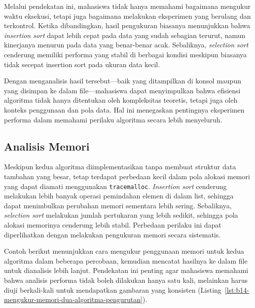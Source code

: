 Melalui pendekatan ini, mahasiswa tidak hanya memahami bagaimana mengukur waktu eksekusi, tetapi juga bagaimana melakukan eksperimen yang berulang dan terkontrol. Ketika dibandingkan, hasil pengukuran biasanya menunjukkan bahwa \textit{insertion sort} dapat lebih cepat pada data yang sudah sebagian terurut, namun kinerjanya menurun pada data yang benar-benar acak. Sebaliknya, \textit{selection sort} cenderung memiliki performa yang stabil di berbagai kondisi meskipun biasanya tidak secepat insertion sort pada ukuran data kecil.

Dengan menganalisis hasil tersebut—baik yang ditampilkan di konsol maupun yang disimpan ke dalam file—mahasiswa dapat menyimpulkan bahwa efisiensi algoritma tidak hanya ditentukan oleh kompleksitas teoretis, tetapi juga oleh konteks penggunaan dan pola data. Hal ini menegaskan pentingnya eksperimen performa dalam memahami perilaku algoritma secara lebih menyeluruh.


\subsection{Analisis Memori}

Meskipun kedua algoritma diimplementasikan tanpa membuat struktur data tambahan yang besar, tetap terdapat perbedaan kecil dalam pola alokasi memori yang dapat diamati menggunakan \texttt{tracemalloc}. \textit{Insertion sort} cenderung melakukan lebih banyak operasi pemindahan elemen di dalam list, sehingga dapat menimbulkan perubahan memori sementara lebih sering. Sebaliknya, \textit{selection sort} melakukan jumlah pertukaran yang lebih sedikit, sehingga pola alokasi memorinya cenderung lebih stabil. Perbedaan perilaku ini dapat diperlihatkan dengan melakukan pengukuran memori secara sistematis.

Contoh berikut menunjukkan cara mengukur penggunaan memori untuk kedua algoritma dalam beberapa percobaan, kemudian mencatat hasilnya ke dalam file untuk dianalisis lebih lanjut. Pendekatan ini penting agar mahasiswa memahami bahwa analisis performa tidak boleh dilakukan hanya satu kali, melainkan harus diuji berkali-kali untuk mendapatkan gambaran yang konsisten (Listing~\ref{lst:b14-mengukur-memori-dua-algoritma-pengurutan}).

